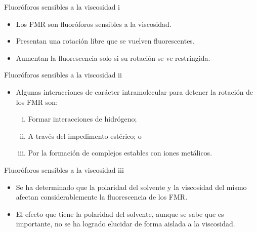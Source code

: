 \documentclass[%
spanish,
mexico]{beamer}
\begin{document}
\begin{frame}{Fluoróforos sensibles a la viscosidad i}
	\begin{itemize}[<+- | alert@+>]
		\item Los \gls{FMR} son fluoróforos sensibles a la viscosidad.
		\item Presentan una rotación libre que se vuelven fluorescentes.
		\item Aumentan la fluorescencia solo si su rotación se ve restringida.
	\end{itemize}
\end{frame}

\begin{frame}{Fluoróforos sensibles a la viscosidad ii}
	\begin{itemize}[<+- | alert@+>]
		\item Algunas interacciones de carácter intramolecular para detener la rotación de los \gls{FMR} son:
		      \begin{enumerate}[i.]
			      \item Formar interacciones de hidrógeno;
			      \item A través del impedimento estérico; o
			      \item Por la formación de complejos estables con iones metálicos.
		      \end{enumerate}
	\end{itemize}
\end{frame}

\begin{frame}{Fluoróforos sensibles a la viscosidad iii}
	\begin{itemize}[<+- | alert@+>]
		\item Se ha determinado que la polaridad del solvente y la viscosidad del mismo afectan considerablemente la fluorescencia de los \gls{FMR}.
		\item El efecto que tiene la polaridad del solvente, aunque se sabe que es importante, no se ha logrado elucidar de forma aislada a la viscosidad.
	\end{itemize}
\end{frame}
\end{document}
